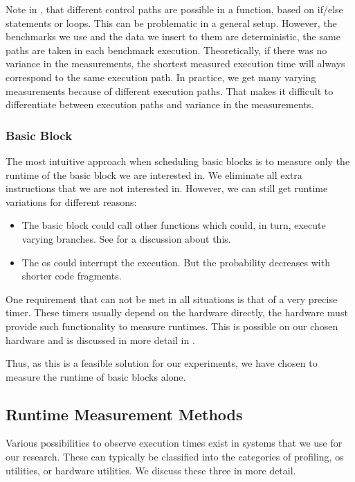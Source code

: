 Note in , that different control paths are possible in a function, based on if/else statements or loops.
This can be problematic in a general setup.
However, the benchmarks we use and the data we insert to them are deterministic, \ie the same paths are taken in each benchmark execution.
Theoretically, if there was no variance in the measurements, the shortest measured execution time will always correspond to the same execution path.
In practice, we get many varying measurements because of different execution paths.
That makes it difficult to differentiate between execution paths and variance in the measurements.

\subsubsection{Basic Block}
The most intuitive approach when scheduling basic blocks is to measure only the runtime of the basic block we are interested in.
We eliminate all extra instructions that we are not interested in.
However, we can still get runtime variations for different reasons:
\begin{itemize}
    \item The basic block could call other functions which could, in turn, execute varying branches. 
          See  for a discussion about this.
    \item The \ac{os} could interrupt the execution. 
          But the probability decreases with shorter code fragments.
\end{itemize}

One requirement that can not be met in all situations is that of a very precise timer.
These timers usually depend on the hardware directly, \ie the hardware must provide such functionality to measure runtimes.
This is possible on our chosen hardware and is discussed in more detail in .

Thus, as this is a feasible solution for our experiments, we have chosen to measure the runtime of basic blocks alone.
    
\subsection{Runtime Measurement Methods}
\label{sec:approach:datageneration:runtime_methods}
Various possibilities to observe execution times exist in systems that we use for our research.
These can typically be classified into the categories of profiling, \ac{os} utilities, or hardware utilities.
We discuss these three in more detail.

